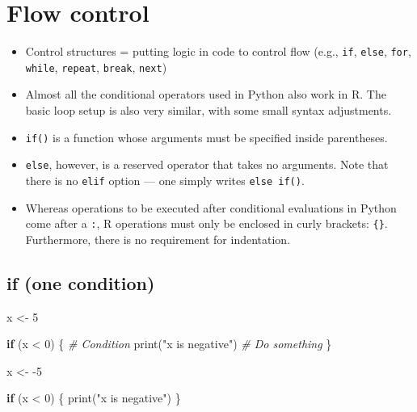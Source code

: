 \documentclass[
]{book}
\newenvironment{Shaded}{\begin{snugshade}}{\end{snugshade}}
\newcommand{\CommentTok}[1]{\textcolor[rgb]{0.56,0.35,0.01}{\textit{#1}}}
\newcommand{\ControlFlowTok}[1]{\textcolor[rgb]{0.13,0.29,0.53}{\textbf{#1}}}
\newcommand{\DecValTok}[1]{\textcolor[rgb]{0.00,0.00,0.81}{#1}}
\newcommand{\FunctionTok}[1]{\textcolor[rgb]{0.00,0.00,0.00}{#1}}
\newcommand{\NormalTok}[1]{#1}
\newcommand{\OtherTok}[1]{\textcolor[rgb]{0.56,0.35,0.01}{#1}}
\newcommand{\SpecialCharTok}[1]{\textcolor[rgb]{0.00,0.00,0.00}{#1}}
\newcommand{\StringTok}[1]{\textcolor[rgb]{0.31,0.60,0.02}{#1}}
\begin{document}
\hypertarget{flow}{%
\section{Flow control}\label{flow}}

\begin{itemize}
\item
  Control structures = putting logic in code to control flow (e.g., \texttt{if}, \texttt{else}, \texttt{for}, \texttt{while}, \texttt{repeat}, \texttt{break}, \texttt{next})
\item
  Almost all the conditional operators used in Python also work in R. The basic loop setup is also very similar, with some small syntax adjustments.
\item
  \texttt{if()} is a function whose arguments must be specified inside parentheses.
\item
  \texttt{else}, however, is a reserved operator that takes no arguments. Note that there is no \texttt{elif} option --- one simply writes \texttt{else\ if()}.
\item
  Whereas operations to be executed after conditional evaluations in Python come after a \texttt{:}, R operations must only be enclosed in curly brackets: \texttt{\{\}}. Furthermore, there is no requirement for indentation.
\end{itemize}

\hypertarget{if-one-condition}{%
\subsection{if (one condition)}\label{if-one-condition}}

\begin{Shaded}
\begin{Highlighting}[]
\NormalTok{x }\OtherTok{\textless{}{-}} \DecValTok{5}

\ControlFlowTok{if}\NormalTok{ (x }\SpecialCharTok{\textless{}} \DecValTok{0}\NormalTok{) \{ }\CommentTok{\# Condition }
  \FunctionTok{print}\NormalTok{(}\StringTok{"x is negative"}\NormalTok{) }\CommentTok{\# Do something }
\NormalTok{\}}
\end{Highlighting}
\end{Shaded}

\begin{Shaded}
\begin{Highlighting}[]
\NormalTok{x }\OtherTok{\textless{}{-}} \SpecialCharTok{{-}}\DecValTok{5}

\ControlFlowTok{if}\NormalTok{ (x }\SpecialCharTok{\textless{}} \DecValTok{0}\NormalTok{) \{}
  \FunctionTok{print}\NormalTok{(}\StringTok{"x is negative"}\NormalTok{)}
\NormalTok{\}}
\end{Highlighting}
\end{Shaded}
\end{document}
